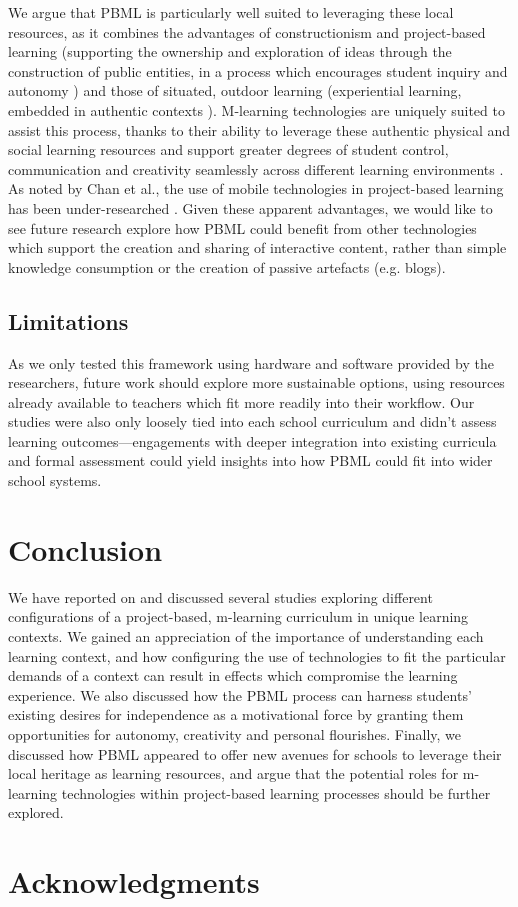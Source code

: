\documentclass[,hyphens]{sigchi}
\begin{document}
We argue that PBML is particularly well suited to leveraging these local resources, as it combines the advantages of constructionism and project-based learning (supporting the ownership and exploration of ideas through the construction of public entities, in a process which encourages student inquiry and autonomy \cite{Noss2017, Larmer2015}) and those of situated, outdoor learning (experiential learning, embedded in authentic contexts \cite{Lave1991}). M-learning technologies are uniquely suited to assist this process, thanks to their ability to leverage these authentic physical and social learning resources and support greater degrees of student control, communication and creativity seamlessly across different learning environments \cite{Sharples2007, Richardson2018}. As noted by Chan et al., the use of mobile technologies in project-based learning has been under-researched \cite{Chan2015}. Given these apparent advantages, we would like to see future research explore how PBML could benefit from other technologies which support the creation and sharing of interactive content, rather than simple knowledge consumption or the creation of passive artefacts (e.g. blogs).

\subsection{Limitations}
As we only tested this framework using hardware and software provided by the researchers, future work should explore more sustainable options, using resources already available to teachers which fit more readily into their workflow. Our studies were also only loosely tied into each school curriculum and didn't assess learning outcomes---engagements with deeper integration into existing curricula and formal assessment could yield insights into how PBML could fit into wider school systems.  

\section{Conclusion}

We have reported on and discussed several studies exploring different configurations of a project-based, m-learning curriculum in unique learning contexts. We gained an appreciation of the importance of understanding each learning context, and how configuring the use of technologies to fit the particular demands of a context can result in effects which compromise the learning experience. We also discussed how the PBML process can harness students' existing desires for independence as a motivational force by granting them opportunities for autonomy, creativity and personal flourishes. Finally, we discussed how PBML appeared to offer new avenues for schools to leverage their local heritage as learning resources, and argue that the potential roles for m-learning technologies within project-based learning processes should be further explored.

\section{Acknowledgments}

\balance{}



\end{document}
